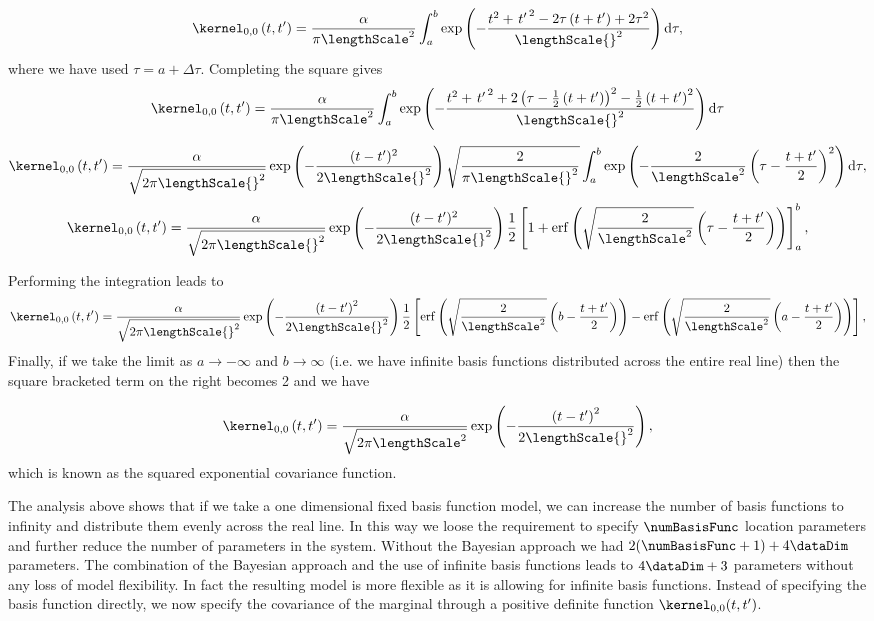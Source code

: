 \documentclass{article}
\begin{document}
\[
\kernel_{0,0}\left(t,t^\prime\right) = \frac{\alpha}{\pi \lengthScale^2}
\int_a^b \exp\left( -\frac{t^2 + \left.t^\prime\right.^2 - 2\tau
    \left(t+t^\prime\right) + 2\tau^2}{\lengthScale{}^2}
\right)\mathrm{d}\tau,
\]
where we have used $\tau = a+\Delta\tau$. Completing the square gives
\[
\kernel_{0,0}\left(t,t^\prime\right) = \frac{\alpha}{\pi \lengthScale^2}
\int_a^b \exp\left( -\frac{t^2 + \left.t^\prime\right.^2 + 2\left(\tau
      - \frac{1}{2}\left(t + t^\prime\right)\right)^2
    -\frac{1}{2}\left(t + t^\prime\right)^2}{\lengthScale{}^2}
\right)\mathrm{d}\tau
\]


\[
\kernel_{0,0}\left(t,t^\prime\right) =
\frac{\alpha}{\sqrt{2\pi\lengthScale{}^2}} \exp\left(
  -\frac{(t-t^\prime)^2}{2\lengthScale{}^2}\right) \sqrt{\frac{2}{\pi
    \lengthScale{}^2}}\int_a^b
\exp\left(-\frac{2}{\lengthScale^2}\left(\tau - \frac{t +
      t^\prime}{2}\right)^2 \right)\mathrm{d}\tau,
\]
\[
\kernel_{0,0}\left(t,t^\prime\right) =
\frac{\alpha}{\sqrt{2\pi\lengthScale{}^2}} \exp\left(
  -\frac{(t-t^\prime)^2}{2\lengthScale{}^2}\right)
\frac{1}{2}\left[1+\mathrm{erf}\left(\sqrt{\frac{2}{\lengthScale^2}}\left(\tau
      - \frac{t + t^\prime}{2}\right) \right)\right]_a^b,
\]

Performing the integration leads to 
\[
\kernel_{0,0}\left(t,t^\prime\right) =
\frac{\alpha}{\sqrt{2\pi\lengthScale{}^2}} \exp\left(
  -\frac{\left(t-t^\prime\right)^2}{2\lengthScale{}^2}\right)
\frac{1}{2}\left[\mathrm{erf}\left(\sqrt{\frac{2}{\lengthScale^2}}\left(b
      - \frac{t + t^\prime}{2}\right) \right) -
  \mathrm{erf}\left(\sqrt{\frac{2}{\lengthScale^2}}\left(a - \frac{t +
        t^\prime}{2}\right) \right)\right],
\]
Finally, if we take the limit as $a\rightarrow -\infty$ and
$b\rightarrow \infty$ (i.e. we have infinite basis functions
distributed across the entire real line) then the square bracketed
term on the right becomes 2 and we have

\begin{equation}
\kernel_{0,0}\left(t,t^\prime\right) =
\frac{\alpha}{\sqrt{2\pi\lengthScale^2}}\exp\left(
  -\frac{\left(t-t^\prime\right)^2}{2\lengthScale{}^2}\right),
\label{eq:RBF}
\end{equation}
which is known as the squared exponential covariance function. 

The analysis above shows that if we take a one dimensional fixed
basis function model, we can increase the number of basis functions to
infinity and distribute them evenly across the real line. In this way
we loose the requirement to specify $\numBasisFunc$ location
parameters and further reduce the number of parameters in the
system. Without the Bayesian approach we had $2(\numBasisFunc +1) +
4\dataDim$ parameters. The combination of the Bayesian approach and
the use of infinite basis functions leads to $4\dataDim + 3$
parameters without any loss of model flexibility. In fact the resulting
model is more flexible as it is allowing for infinite basis
functions. Instead of specifying the basis function directly, we now
specify the covariance of the marginal through a positive definite
function $\kernel_{0,0}(t, t^\prime)$.
\end{document}
